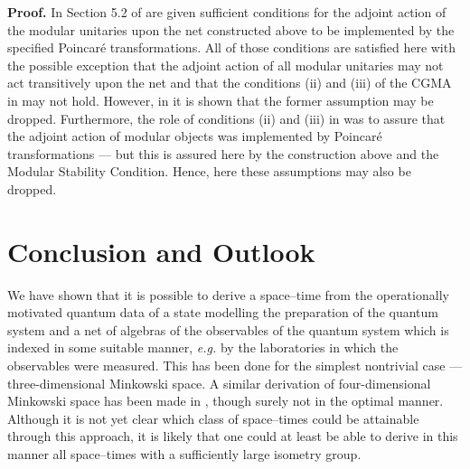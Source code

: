 \documentclass[a4paper,twoside,12pt]{article}
\newenvironment{proof}{\medskip \noindent 
            {\bf Proof.}}{ \hfill \myHighlight{$\square$}\coordHE{} \medskip}
\def\msc{{Modular Stability Condition}}
\begin{document}
\begin{proof} In Section 5.2 of \cite{BDFS} are given sufficient 
conditions for the adjoint action of the modular unitaries
\coordHE{} upon the net constructed above to be implemented by
the specified Poincar\'e transformations. All of those conditions are
satisfied here with the possible exception that the adjoint action of
all modular unitaries may not act transitively upon the net and that
the conditions (ii) and (iii) of the CGMA in \cite{BDFS} may not
hold. However, in \cite{BFS2,F} it is shown that the former assumption
may be dropped. Furthermore, the role of conditions (ii) and (iii) in
\cite{BDFS} was to assure that the adjoint action of modular objects
was implemented by Poincar\'e transformations --- but this is assured
here by the construction above and the \msc. Hence, here these
assumptions may also be dropped.
\end{proof}

\section{Conclusion and Outlook}

     We have shown that it is possible to derive a space--time from
the operationally motivated quantum data of a state modelling the
preparation of the quantum system and a net of algebras of the
observables of the quantum system which is indexed in some suitable
manner, {\it e.g.} by the laboratories in which the observables were
measured. This has been done for the simplest nontrivial case ---
three-dimensional Minkowski space.  A similar derivation of
four-dimensional Minkowski space has been made in \cite{Wh}, though
surely not in the optimal manner. Although it is not yet clear which
class of space--times could be attainable through this approach,
it is likely that one could at least be able to derive in this manner
all space--times with a sufficiently large isometry group.
\end{document}

